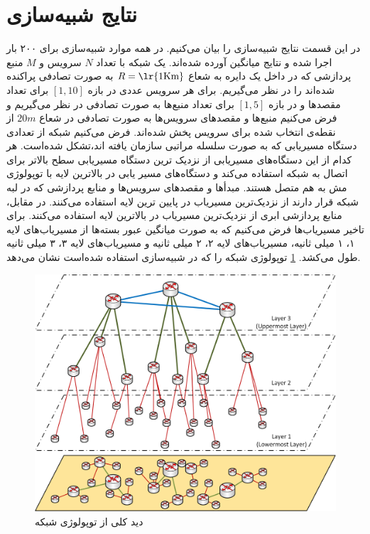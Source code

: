   \section{نتایج شبیه‌سازی}
    در این قسمت نتایج شبیه‌سازی را بیان می‌کنیم.
    در همه موارد شبیه‌سازی برای ۲۰۰ بار اجرا شده و نتایج میانگین آورده شده‌اند.
    یک شبکه با تعداد $N$ سرویس و $M$ منبع پردازشی که در داخل یک دایره به شعاع $R=\text{\lr{1Km}}$ به صورت تصادفی پراکنده ‌شده‌اند را در نظر می‌گیریم.
    برای هر سرویس عددی در بازه $[1,10]$ برای تعداد مقصد‌ها و در بازه $[1,5]$ برای تعداد منبع‌ها به صورت تصادفی در نظر می‌گیریم و فرض می‌کنیم منبع‌ها و مقصد‌های سرویس‌ها به صورت تصادفی در شعاع $20m$ از نقطه‌ی انتخاب شده برای سرویس پخش شده‌اند.
    فرض می‌کنیم شبکه از تعدادی دستگاه مسیریابی که به صورت سلسله مراتبی سازمان یافته اند،‌تشکل شده‌است.
    هر کدام از این دستگاه‌های مسیر‌یابی از نزدیک ترین دستگاه مسیریابی سطح بالاتر برای اتصال به شبکه استفاده می‌کند و دستگاه‌های مسیر یابی در بالاترین لایه با {توپولوژی مش} به هم متصل هستند.
    مبدأ‌ها و مقصدهای سرویس‌ها و منابع پردازشی که در لبه شبکه قرار دارند از نزدیک‌ترین مسیریاب در پایین ترین لایه استفاده می‌کنند.
    در مقابل، منابع پردازشی ابری از نزدیک‌ترین مسیریاب در بالاترین لایه استفاده می‌کنند.
    برای تاخیر مسیریاب‌ها فرض می‌کنیم که به صورت میانگین عبور بسته‌ها از مسیریاب‌های لایه ۱، ۱ میلی ثانیه، مسیریاب‌های لایه ۲، ۲ میلی ثانیه و مسیریاب‌های لایه ۳، ۳ میلی ثانیه طول می‌کشد.
    \cref{fig:network} توپولوژی شبکه را که در شبیه‌سازی استفاده شده‌است نشان می‌دهد.
    
    \begin{figure}[h]
      \centerline{\includegraphics[width=15cm]{graphics/one_to_one/network}}
      \caption{دید کلی از توپولوژی شبکه}
      \label{fig:network}
    \end{figure}

